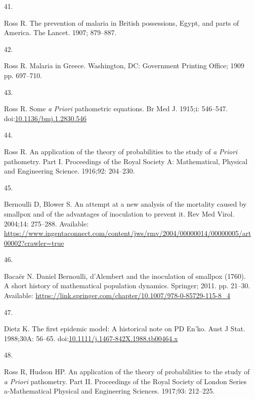 \documentclass[
]{book}
\newlength{\cslhangindent}
\newlength{\csllabelwidth}
\newenvironment{CSLReferences}[2] %
 {\begin{list}{}{%
  \setlength{\itemindent}{0pt}
  \setlength{\leftmargin}{0pt}
  \setlength{\parsep}{0pt}
  \ifodd #1
   \setlength{\leftmargin}{\cslhangindent}
   \setlength{\itemindent}{-1\cslhangindent}
  \fi
  \setlength{\itemsep}{#2\baselineskip}}}
 {\end{list}}
\newcommand{\CSLLeftMargin}[1]{\parbox[t]{\csllabelwidth}{\strut#1\strut}}
\newcommand{\CSLRightInline}[1]{\parbox[t]{\linewidth - \csllabelwidth}{\strut#1\strut}}
\begin{document}
\begin{CSLReferences}{0}{1}
\CSLLeftMargin{41. }%
\CSLRightInline{Ross R. The prevention of malaria in {British} possessions, {Egypt}, and parts of {America}. The Lancet. 1907; 879--887. }

\CSLLeftMargin{42. }%
\CSLRightInline{Ross R. Malaria in {Greece}. {Washington, DC}: {Government Printing Office}; 1909 pp. 697--710. }

\CSLLeftMargin{43. }%
\CSLRightInline{Ross R. Some {\emph{a Priori}} pathometric equations. Br Med J. 1915;i: 546--547. doi:\href{https://doi.org/10.1136/bmj.1.2830.546}{10.1136/bmj.1.2830.546}}

\CSLLeftMargin{44. }%
\CSLRightInline{Ross R. An application of the theory of probabilities to the study of {\emph{a Priori}} pathometry. {Part I}. Proceedings of the Royal Society A: Mathematical, Physical and Engineering Science. 1916;92: 204--230. }

\CSLLeftMargin{45. }%
\CSLRightInline{Bernoulli D, Blower S. An attempt at a new analysis of the mortality caused by smallpox and of the advantages of inoculation to prevent it. Rev Med Virol. 2004;14: 275--288. Available: \url{https://www.ingentaconnect.com/content/jws/rmv/2004/00000014/00000005/art00002?crawler=true}}

\CSLLeftMargin{46. }%
\CSLRightInline{Bacaër N. Daniel {Bernoulli}, d'{Alembert} and the inoculation of smallpox (1760). A short history of mathematical population dynamics. {Springer}; 2011. pp. 21--30. Available: \url{https://link.springer.com/chapter/10.1007/978-0-85729-115-8_4}}

\CSLLeftMargin{47. }%
\CSLRightInline{Dietz K. The first epidemic model: A historical note on {PD En}'ko. Aust J Stat. 1988;30A: 56--65. doi:\href{https://doi.org/10.1111/j.1467-842X.1988.tb00464.x}{10.1111/j.1467-842X.1988.tb00464.x}}

\CSLLeftMargin{48. }%
\CSLRightInline{Ross R, Hudson HP. An application of the theory of probabilities to the study of {\emph{a Priori}} pathometry. {Part II}. Proceedings of the Royal Society of London Series a-Mathematical Physical and Engineering Sciences. 1917;93: 212--225. }


\end{CSLReferences}
\end{document}
